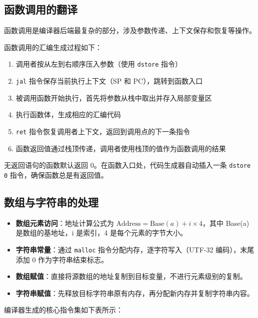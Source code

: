 \documentclass[12pt,hyperref,a4paper,UTF8]{ctexart}
\begin{document}
\subsection{函数调用的翻译}

函数调用是编译器后端最复杂的部分，涉及参数传递、上下文保存和恢复等操作。

函数调用的汇编生成过程如下：

\begin{enumerate}
    \item 调用者按从左到右顺序压入参数（使用 \texttt{dstore} 指令）
    \item \texttt{jal} 指令保存当前执行上下文（SP 和 PC），跳转到函数入口
    \item 被调用函数开始执行，首先将参数从栈中取出并存入局部变量区
    \item 执行函数体，生成相应的汇编代码
    \item \texttt{ret} 指令恢复调用者上下文，返回到调用点的下一条指令
    \item 函数返回值通过栈顶传递，调用者使用栈顶的值作为函数调用的结果
\end{enumerate}

无返回语句的函数默认返回 0。在函数入口处，代码生成器自动插入一条 \texttt{dstore 0} 指令，确保函数总是有返回值。

\subsection{数组与字符串的处理}

\begin{itemize}
    \item \textbf{数组元素访问}：地址计算公式为 $\text{Address} = \text{Base}(a) + i \times 4$，其中 Base(a) 是数组的基地址，i 是索引，4 是每个元素的字节大小。
    \item \textbf{字符串常量}：通过 \texttt{malloc} 指令分配内存，逐字符写入（UTF-32 编码），末尾添加 0 作为字符串结束标志。
    \item \textbf{数组赋值}：直接将源数组的地址复制到目标变量，不进行元素级别的复制。
    \item \textbf{字符串赋值}：先释放目标字符串原有内存，再分配新内存并复制字符串内容。
\end{itemize}

编译器生成的核心指令集如下表所示：
\end{document}
